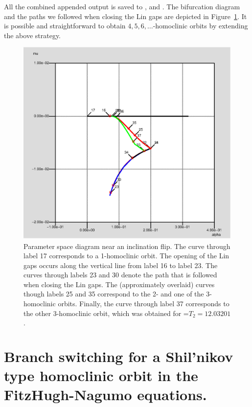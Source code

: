 \documentclass[12pt]{report}
\begin{document}
All the combined appended output is saved to , 
and .
The bifurcation diagram and the paths we followed when closing the Lin
gaps are depicted in Figure~\ref{parspace}. It is possible and
straightforward to obtain $4, 5, 6, \dots$-homoclinic orbits by 
extending the above strategy.
\begin{figure}[htb]
\begin{center}
\includegraphics[scale=0.5]{include/parspace}
\caption{Parameter space diagram near an inclination flip. 
The curve
through label 17 corresponds to a 1-homoclinic orbit. 
The opening of the Lin gaps occurs along the vertical line from
label 16 to label 23. The curves
through labels 23 and 30 denote the path that is followed when
closing the Lin gaps. The (approximately overlaid)
curves though labels 25 and 35 correspond to the 
2- and one of the 3-homoclinic orbits.
Finally, the curve through label 37 corresponds to the other
3-homoclinic orbit, which was obtained for =$T_2=12.03201$.}
\label{parspace}
\end{center}
\end{figure}

\section{ Branch switching for a Shil'nikov type homoclinic orbit in
the FitzHugh-Nagumo equations.}
\end{document}

